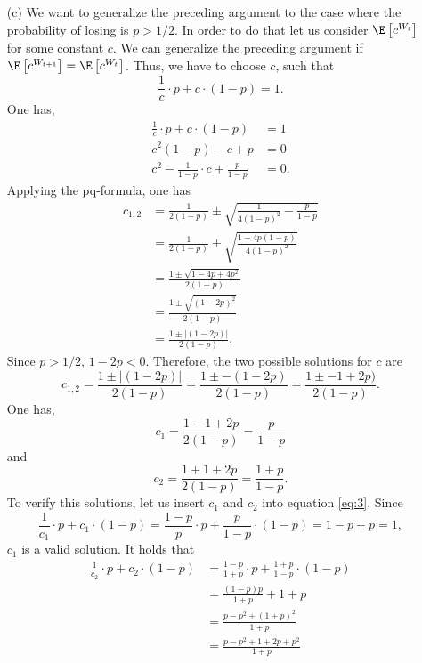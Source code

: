 \begin{enumerate}
  \item[(c)] We want to generalize the preceding argument to the case where the
  probability of losing is $p > 1/2$. In order to do that let us consider
  $\E\left[c^{W_t}\right]$ for some constant $c$. We can generalize the preceding
  argument if $\E\left[c^{W_{t+1}}\right] = \E\left[c^{W_t}\right]$. Thus, we
  have to choose $c$, such that
  \begin{equation}\label{eq:3}
    \frac{1}{c} \cdot p + c \cdot (1-p) = 1.
  \end{equation}
  One has,
  \begin{align*}
    \frac{1}{c} \cdot p + c \cdot (1-p) &= 1 \\
    c^2(1-p) - c + p                    &= 0 \\
    c^2 - \frac{1}{1-p} \cdot c + \frac{p}{1-p} &= 0.
  \end{align*}
  Applying the pq-formula, one has
  \begin{align*}
    c_{1,2}
      &= \frac{1}{2(1-p)} \pm \sqrt{\frac{1}{4(1-p)^2} - \frac{p}{1-p}} \\
      &= \frac{1}{2(1-p)} \pm \sqrt{\frac{1 - 4p(1-p)}{4(1-p)^2}} \\
      &= \frac{1 \pm \sqrt{1 - 4p + 4p^2}}{2(1-p)} \\
      &= \frac{1 \pm \sqrt{(1 - 2p)^2}}{2(1-p)} \\
      &= \frac{1 \pm |(1 - 2p)|}{2(1-p)}.
  \end{align*}
  Since $p > 1/2$, $1 - 2p < 0$. Therefore, the two possible solutions for $c$ are
  \[
    c_{1,2}
      = \frac{1 \pm |(1 - 2p)|}{2(1-p)}
      = \frac{1 \pm -(1 - 2p)}{2(1-p)}
      = \frac{1 \pm -1 + 2p)}{2(1-p)}.
  \]
  One has,
  \[ c_1 = \frac{1 - 1 + 2p}{2(1-p)} = \frac{p}{1-p} \]
  and
  \[ c_2 = \frac{1 + 1 + 2p}{2(1-p)} = \frac{1+p}{1-p}. \]
  To verify this solutions, let us insert $c_1$ and $c_2$ into equation
  \eqref{eq:3}. Since
  \[
    \frac{1}{c_1} \cdot p + c_1 \cdot (1-p)
      = \frac{1-p}{p} \cdot p + \frac{p}{1-p} \cdot (1-p)
      = 1 - p + p
      = 1,
  \]
  $c_1$ is a valid solution. It holds that
  \begin{align*}
    \frac{1}{c_2} \cdot p + c_2 \cdot (1-p)
      &= \frac{1-p}{1+p} \cdot p + \frac{1+p}{1-p} \cdot (1-p) \\
      &= \frac{(1-p)p}{1+p} + 1 + p \\
      &= \frac{p - p^2 + (1+p)^2}{1+p} \\
      &= \frac{p - p^2 + 1 + 2p + p^2}{1+p} \\

\end{align*}
\end{enumerate}

